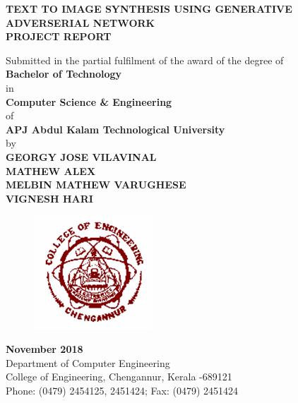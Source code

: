 \documentclass[a4paper,12pt,oneside]{article}
\begin{document}
\thispagestyle{empty}
\begin{center}

\large{\textbf{{TEXT TO IMAGE SYNTHESIS USING GENERATIVE ADVERSERIAL NETWORK}}}
\setlength{\baselineskip}{1.5\baselineskip}
\\
\vspace{5mm}
\textbf{PROJECT REPORT}

Submitted in the partial fulfilment of the award of the degree
of
\\
\textbf{Bachelor of Technology}
\\
in
\\
\textbf{Computer Science \& Engineering}
\\
of
\\
\textbf{APJ Abdul Kalam Technological University}
\\
by
\\
\textbf{GEORGY JOSE VILAVINAL}
\\
\textbf{MATHEW ALEX}
\\
\textbf{MELBIN MATHEW VARUGHESE}
\\
\textbf{VIGNESH HARI}
\\
\vspace{5mm}
\begin{figure}[H]
\centering
\includegraphics{ceclogo.png}
\end{figure}
\textbf{November 2018}
\vspace{8mm}
\\
Department of Computer Engineering
\\
College of Engineering, Chengannur, Kerala -689121
\\
Phone: (0479) 2454125, 2451424; Fax: (0479) 2451424
\\
\end{center}
\end{document}
